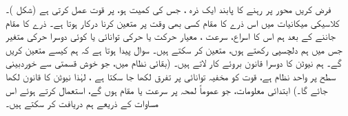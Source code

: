 
فرض کریں محور  پر رہنے کا پابند ایک ذرہ ، جس کی کمیت  ہو،   پر قوت  عمل کرتی ہے (شکل )۔ کلاسیکی میکانیات میں اس ذرے کا مقام  کسی بھی وقت  پر متعین کرنا درکار ہوتا ہے۔ ذرے کا مقام جاننے کے بعد ہم اس کا اسراع، سرعت ، معیار حرکت   یا حرکی توانائی  یا کوئی  دوسرا  حرکی متغیر جس میں ہم دلچسپی رکھتے ہوں، متعین کر سکتے ہیں۔ سوال پیدا ہوتا ہے کہ ہم  کیسے متعین کریں گے۔ ہم نیوٹن کا دوسرا قانون  بروئے کار لاتے ہیں۔ (بقائی نظام میں،  جو خوش قسمتی سے خوردبینی سطح پر واحد نظام ہے،  قوت کو مخفیہ توانائی پر تفرق لکھا جا سکتا ہے ، لہٰذا نیوٹن کا قانون  لکھا جائے گا۔) ابتدائی معلومات، جو عموماً لمحہ  پر سرعت یا مقام ہوں گے،  استعمال کرتے ہوئے اس مساوات کے ذریعے  ہم  دریافت کر سکتے ہیں۔
 

